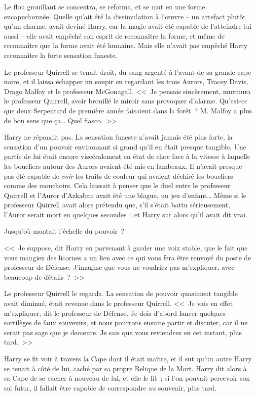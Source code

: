 Le flou grouillant se concentra, se reforma, et se mut en une forme encapuchonnée. Quelle qu'ait été la dissimulation à l'œuvre -- un artefact plutôt qu'un charme, avait deviné Harry, car la magie avait été capable de l'atteindre lui aussi -- elle avait empêché son esprit de reconnaître la forme, et même de reconnaître que la forme avait été humaine. Mais elle n'avait pas empêché Harry reconnaître la forte sensation funeste.

Le professeur Quirrell se tenait droit, du sang argenté à l'avant de sa grande cape noire, et il laissa échapper un soupir en regardant les trois Aurors, Tracey Davis, Drago Malfoy et le professeur McGonagall. <<~Je pensais sincèrement, murmura le professeur Quirrell, avoir brouillé le miroir sans provoquer d'alarme. Qu'est-ce que deux Serpentard de première année faisaient dans la forêt~? M. Malfoy a plus de bon sens que ça… Quel fiasco.~>>

Harry ne répondit pas. La sensation funeste n'avait jamais été plus forte, la sensation d'un pouvoir environnant si grand qu'il en était presque tangible. Une partie de lui était encore viscéralement en état de choc face à la vitesse à laquelle les boucliers autour des Aurors avaient été mis en lambeaux. Il n'avait presque pas été capable de \emph{voir} les traits de couleur qui avaient déchiré les boucliers comme des mouchoirs. Cela laissait à penser que le duel entre le professeur Quirrell et l'Auror d'Azkaban avait été une blague, un jeu d'enfant… Même si le professeur Quirrell avait alors prétendu que, s'il s'était battu sérieusement, l'Auror serait mort en quelques secondes~; et Harry sut alors qu'il avait dit vrai.

Jusqu'où montait l'échelle du pouvoir~?

<<~Je suppose, dit Harry en parvenant à garder une voix stable, que le fait que vous mangiez des licornes a un lien avec ce qui vous fera être renvoyé du poste de professeur de Défense. J'imagine que vous ne voudriez pas m'expliquer, avec beaucoup de détails~?~>>

Le professeur Quirrell le regarda. La sensation de pouvoir quasiment tangible avait diminué, était revenue dans le professeur Quirrell. <<~Je vais en effet m'expliquer, dit le professeur de Défense. Je dois d'abord lancer quelques sortilèges de faux souvenirs, et nous pourrons ensuite partir et discuter, car il ne serait pas sage que je demeure. Je sais que vous reviendrez en cet instant, plus tard.~>>

Harry se fit voir à travers la Cape dont il était maître, et il sut qu'un autre Harry se tenait à côté de lui, caché par sa propre Relique de la Mort. Harry dit alors à sa Cape de se cacher à nouveau de lui, et elle le fit~; si l'on pouvait percevoir son soi futur, il fallait être capable de correspondre au souvenir, plus tard.

